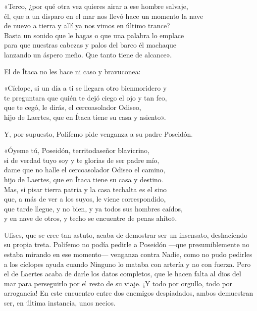 \begin{versocita}
«Terco, ¿por qué otra vez quieres airar a ese hombre salvaje,\\
él, que a un disparo en el mar nos llevó hace un momento la nave\\
de nuevo a tierra y allí ya nos vimos en último trance?\\
Basta un sonido que le hagas o que una palabra lo emplace\\
para que nuestras cabezas y palos del barco él machaque\\
lanzando un áspero meño. Que tanto tiene de alcance».
\end{versocita}

El de Ítaca no les hace ni caso y bravuconea:

\begin{versocita}
«Cíclope, si un día a ti se llegara otro bienmoridero y\\
te preguntara que quién te dejó ciego el ojo y tan feo,\\
que te cegó, le dirás, el cercoasolador Odiseo,\\
hijo de Laertes, que en Ítaca tiene su casa y asiento».
\end{versocita}

Y, por supuesto, Polifemo pide venganza a su padre Poseidón.

\begin{versocita}
«Óyeme tú, Poseidón, territodaseñor blavicrino,\\
si de verdad tuyo soy y te glorias de ser padre mío,\\
dame que no halle el cercoasolador Odiseo el camino,\\
hijo de Laertes, que en Ítaca tiene su casa y destino.\\
Mas, si pisar tierra patria y la casa techalta es el sino\\
que, a más de ver a los suyos, le viene correspondido,\\
que tarde llegue, y no bien, y ya todos sus hombres caídos,\\
y en nave de otros, y techo se encuentre de penas ahíto».
\end{versocita}

Ulises, que se cree tan astuto, acaba de demostrar ser un insensato, deshaciendo su propia treta. Polifemo no podía pedirle a Poseidón ---que presumiblemente no estaba mirando en ese momento--- venganza contra Nadie, como no pudo pedirles a los cíclopes ayuda cuando Ninguno lo mataba con artería y no con fuerza. Pero el de Laertes acaba de darle los datos completos, que le hacen falta al dios del mar para perseguirlo por el resto de su viaje. ¡Y todo por orgullo, todo por arrogancia! En este encuentro entre dos enemigos despiadados, ambos demuestran ser, en última instancia, unos necios.

